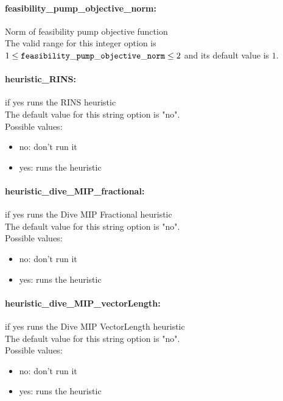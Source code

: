 \paragraph{\bf feasibility\_pump\_objective\_norm:}\label{sec:feasibility_pump_objective_norm} Norm of feasibility pump objective function $\;$ \\
 The valid range for this integer option is
$1 \le {\tt feasibility\_pump\_objective\_norm } \le 2$
and its default value is $1$.


\paragraph{\bf heuristic\_RINS:}\label{sec:heuristic_RINS} if yes runs the RINS heuristic $\;$ \\

The default value for this string option is "no".
\\ 
Possible values:
\begin{itemize}
   \item no: don't run it
   \item yes: runs the heuristic
\end{itemize}

\paragraph{\bf heuristic\_dive\_MIP\_fractional:}\label{sec:heuristic_dive_MIP_fractional} if yes runs the Dive MIP Fractional heuristic $\;$ \\

The default value for this string option is "no".
\\ 
Possible values:
\begin{itemize}
   \item no: don't run it
   \item yes: runs the heuristic
\end{itemize}

\paragraph{\bf heuristic\_dive\_MIP\_vectorLength:}\label{sec:heuristic_dive_MIP_vectorLength} if yes runs the Dive MIP VectorLength heuristic $\;$ \\

The default value for this string option is "no".
\\ 
Possible values:
\begin{itemize}
   \item no: don't run it
   \item yes: runs the heuristic
\end{itemize}

